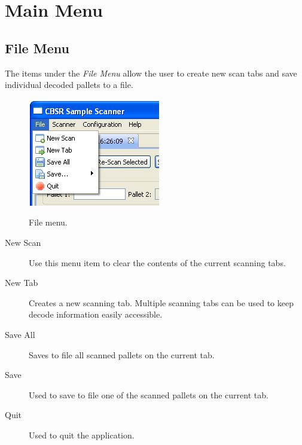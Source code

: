 \section{Main Menu}
\label{sec:main_menu}
\subsection{File Menu}
The items under the \emph{File Menu} allow the user to create new scan tabs
and save individual decoded pallets to a file.
\begin{figure}[H]
  \centering
  \scalebox{0.5}
	   { \includegraphics*{screenshots/overview/file_menu} }
	   \caption{File menu.}
	   \label{fig:file_menu}
\end{figure}
\begin{description}
\item[New Scan] Use this menu item to clear the contents of the current
  scanning tabs.
\item[New Tab] Creates a new scanning tab. Multiple scanning tabs can be used
  to keep decode information easily accessible.
\item[Save All] Saves to file all scanned pallets on the current tab.
\item[Save] Used to save to file one of the scanned pallets on the current tab.
\item[Quit] Used to quit the application.
\end{description}

